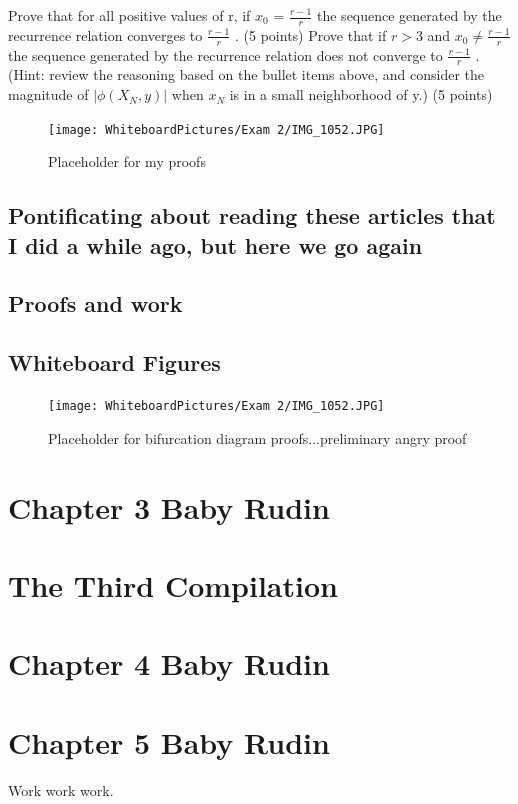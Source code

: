 Prove that for all positive values of r, if $x_0$ =
$\frac{r-1}{r}$
 the sequence generated by the recurrence relation
converges to $\frac{r-1}{r}$
. (5 points)
Prove that if $r>3$ and $x_0 \neq \frac{r-1}{r}$the sequence generated by the recurrence relation does not
converge to $\frac{r-1}{r}$
. (Hint: review the reasoning based on the bullet items above, and consider the
magnitude of $|\phi (X_N,y)|$ when  $x_N$  is in a small neighborhood of   y.) (5 points)
\begin{figure}[h]\begin{center}\texttt{[image: WhiteboardPictures/Exam 2/IMG\_1052.JPG]}
\caption{Placeholder for my proofs} \label{fig:Euler_pic}\end{center}\end{figure} 

\subsection{Pontificating about reading these articles that I did a while ago, but here we go again}


\subsection{Proofs and work}


\subsection{Whiteboard Figures}
\begin{figure}[ht]\begin{center}\texttt{[image: WhiteboardPictures/Exam 2/IMG\_1052.JPG]}
\caption{Placeholder for bifurcation diagram proofs...preliminary angry proof} \label{fig:Euler_pic}\end{center}\end{figure} 




\section{Chapter 3 Baby Rudin}


\section{The Third Compilation}


\section{Chapter 4 Baby Rudin}



\section{Chapter 5 Baby Rudin}


Work work work.




\section{}